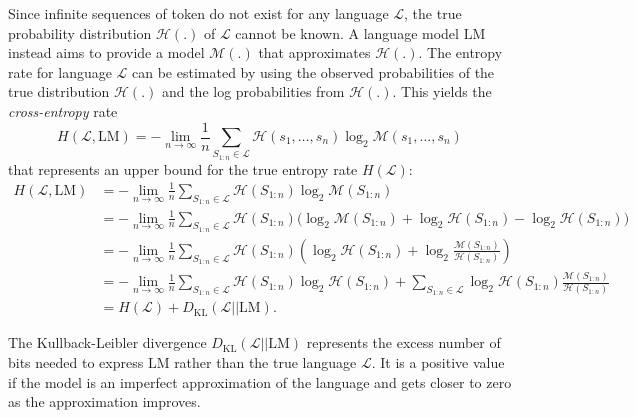    Since infinite sequences of token do not exist for any language $\mathcal{L}$, the true probability distribution $\mathcal{H}(.)$ of $\mathcal{L}$ cannot be known.
    A language model $\mathrm{LM}$ instead aims to provide a model $\mathcal{M}(.)$ that approximates $\mathcal{H}(.)$.
    The entropy rate for language $\mathcal{L}$ can be estimated by using the observed probabilities of the true distribution $\mathcal{H}(.)$ and the log probabilities from $\mathcal{H}(.)$.
    This yields the \emph{cross-entropy} rate
    \begin{equation}
    \label{eq:cross-entropy}
        H(\mathcal{L},\mathrm{LM}) = - \lim_{n \to \infty} \frac{1}{n} \sum_{S_{1:n} \in \mathcal{L}} \mathcal{H}(s_1, \dots, s_n) \log_2 \mathcal{M}(s_1, \dots, s_n)
    \end{equation}
    that represents an upper bound for the true entropy rate $H(\mathcal{L})$:
    \begin{equation}
    \begin{split}
        H(\mathcal{L},\mathrm{LM}) & = - \lim_{n \to \infty} \frac{1}{n} \sum_{S_{1:n} \in \mathcal{L}} \mathcal{H}(S_{1:n}) \log_2 \mathcal{M}(S_{1:n}) \\
            & = - \lim_{n \to \infty} \frac{1}{n} \sum_{S_{1:n} \in \mathcal{L}} \mathcal{H}(S_{1:n}) \big(\log_2 \mathcal{M}(S_{1:n}) + \log_2 \mathcal{H}(S_{1:n}) - \log_2 \mathcal{H}(S_{1:n}) \big) \\
            & = - \lim_{n \to \infty} \frac{1}{n} \sum_{S_{1:n} \in \mathcal{L}} \mathcal{H}(S_{1:n}) \left( \log_2 \mathcal{H}(S_{1:n}) + \log_2 \frac{\mathcal{M}(S_{1:n})}{\mathcal{H}(S_{1:n})} \right) \\
            & = - \lim_{n \to \infty} \frac{1}{n} \sum_{S_{1:n} \in \mathcal{L}} \mathcal{H}(S_{1:n}) \log_2 \mathcal{H}(S_{1:n}) + \sum_{S_{1:n} \in \mathcal{L}} \log_2 \mathcal{H}(S_{1:n}) \frac{\mathcal{M}(S_{1:n})}{\mathcal{H}(S_{1:n})} \\
            & = H(\mathcal{L}) + D_{\mathrm{KL}}(\mathcal{L} || \mathrm{LM}) \text{.}
    \end{split}
    \end{equation}

    The Kullback-Leibler divergence $D_{\mathrm{KL}}(\mathcal{L} || \mathrm{LM})$ represents the excess number of bits needed to express $\mathrm{LM}$ rather than the true language $\mathcal{L}$.
    It is a positive value if the model is an imperfect approximation of the language and gets closer to zero as the approximation improves.

